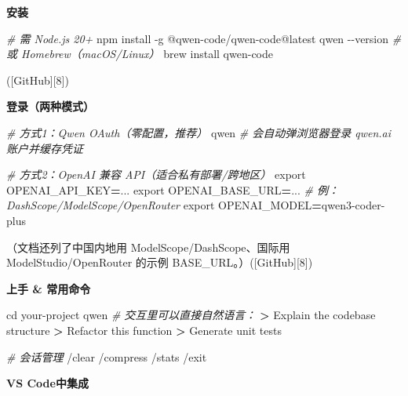 \documentclass[
]{book}
\newenvironment{Shaded}{\begin{snugshade}}{\end{snugshade}}
\newcommand{\AttributeTok}[1]{\textcolor[rgb]{0.13,0.29,0.53}{#1}}
\newcommand{\BuiltInTok}[1]{#1}
\newcommand{\CommentTok}[1]{\textcolor[rgb]{0.56,0.35,0.01}{\textit{#1}}}
\newcommand{\ExtensionTok}[1]{#1}
\newcommand{\NormalTok}[1]{#1}
\newcommand{\OperatorTok}[1]{\textcolor[rgb]{0.81,0.36,0.00}{\textbf{#1}}}
\newcommand{\VariableTok}[1]{\textcolor[rgb]{0.00,0.00,0.00}{#1}}
\begin{document}
\textbf{安装}

\begin{Shaded}
\begin{Highlighting}[]
\CommentTok{\# 需 Node.js 20+}
\ExtensionTok{npm}\NormalTok{ install }\AttributeTok{{-}g}\NormalTok{ @qwen{-}code/qwen{-}code@latest}
\ExtensionTok{qwen} \AttributeTok{{-}{-}version}
\CommentTok{\# 或 Homebrew（macOS/Linux）}
\ExtensionTok{brew}\NormalTok{ install qwen{-}code}
\end{Highlighting}
\end{Shaded}

({[}GitHub{]}{[}8{]})

\textbf{登录（两种模式）}

\begin{Shaded}
\begin{Highlighting}[]
\CommentTok{\# 方式1：Qwen OAuth（零配置，推荐）}
\ExtensionTok{qwen}    \CommentTok{\# 会自动弹浏览器登录 qwen.ai 账户并缓存凭证}

\CommentTok{\# 方式2：OpenAI 兼容 API（适合私有部署/跨地区）}
\BuiltInTok{export} \VariableTok{OPENAI\_API\_KEY}\OperatorTok{=}\NormalTok{...}
\BuiltInTok{export} \VariableTok{OPENAI\_BASE\_URL}\OperatorTok{=}\NormalTok{...    }\CommentTok{\# 例：DashScope/ModelScope/OpenRouter}
\BuiltInTok{export} \VariableTok{OPENAI\_MODEL}\OperatorTok{=}\NormalTok{qwen3{-}coder{-}plus}
\end{Highlighting}
\end{Shaded}

（文档还列了中国内地用 ModelScope/DashScope、国际用 ModelStudio/OpenRouter 的示例 BASE\_URL。）({[}GitHub{]}{[}8{]})

\textbf{上手 \& 常用命令}

\begin{Shaded}
\begin{Highlighting}[]
\BuiltInTok{cd}\NormalTok{ your{-}project}
\ExtensionTok{qwen}
\CommentTok{\# 交互里可以直接自然语言：}
\OperatorTok{\textgreater{}}\NormalTok{ Explain }\ExtensionTok{the}\NormalTok{ codebase structure}
\OperatorTok{\textgreater{}}\NormalTok{ Refactor }\ExtensionTok{this}\NormalTok{ function}
\OperatorTok{\textgreater{}}\NormalTok{ Generate }\ExtensionTok{unit}\NormalTok{ tests}

\CommentTok{\# 会话管理}
\ExtensionTok{/clear}\NormalTok{   /compress   /stats   /exit}
\end{Highlighting}
\end{Shaded}

\textbf{VS Code中集成}
\end{document}
